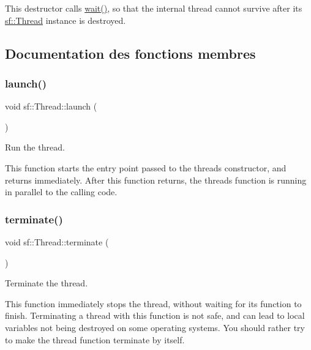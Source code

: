 This destructor calls \hyperlink{classsf_1_1Thread_a724b1f94c2d54f84280f2f78bde95fa0}{wait()}, so that the internal thread cannot survive after its \hyperlink{classsf_1_1Thread}{sf\+::\+Thread} instance is destroyed. 

\subsection{Documentation des fonctions membres}
\mbox{\label{classsf_1_1Thread_a74f75a9e86e1eb47479496314048b5f6}} 
\subsubsection{\texorpdfstring{launch()}{launch()}}
{\footnotesize\ttfamily void sf\+::\+Thread\+::launch (\begin{DoxyParamCaption}{ }\end{DoxyParamCaption})}



Run the thread. 

This function starts the entry point passed to the thread\textquotesingle{}s constructor, and returns immediately. After this function returns, the thread\textquotesingle{}s function is running in parallel to the calling code. \mbox{\label{classsf_1_1Thread_ad6b205d4f1ce38b8d44bba0f5501477c}} 
\subsubsection{\texorpdfstring{terminate()}{terminate()}}
{\footnotesize\ttfamily void sf\+::\+Thread\+::terminate (\begin{DoxyParamCaption}{ }\end{DoxyParamCaption})}



Terminate the thread. 

This function immediately stops the thread, without waiting for its function to finish. Terminating a thread with this function is not safe, and can lead to local variables not being destroyed on some operating systems. You should rather try to make the thread function terminate by itself. \mbox{\label{classsf_1_1Thread_a724b1f94c2d54f84280f2f78bde95fa0}} 
